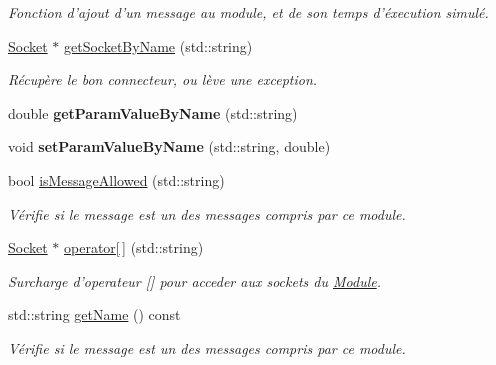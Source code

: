 \begin{DoxyCompactItemize}
\begin{DoxyCompactList}\small\item\em Fonction d'ajout d'un message au module, et de son temps d'éxecution simulé. \end{DoxyCompactList}\item 
\hyperlink{classSocket}{Socket} $\ast$ \hyperlink{classModule_aed844ffed911793d3895c5a2bc4f9d43}{get\-Socket\-By\-Name} (std\-::string)
\begin{DoxyCompactList}\small\item\em Récupère le bon connecteur, ou lève une exception. \end{DoxyCompactList}\item 
\hypertarget{classModule_a93e2ee84587751939c1fd31cb0802e41}{double {\bfseries get\-Param\-Value\-By\-Name} (std\-::string)}\label{classModule_a93e2ee84587751939c1fd31cb0802e41}

\item 
\hypertarget{classModule_ace0e4299e1a6f9b46aa9fd316483895d}{void {\bfseries set\-Param\-Value\-By\-Name} (std\-::string, double)}\label{classModule_ace0e4299e1a6f9b46aa9fd316483895d}

\item 
\hypertarget{classModule_a6e425394cec58009568822cc7a09c8c1}{bool \hyperlink{classModule_a6e425394cec58009568822cc7a09c8c1}{is\-Message\-Allowed} (std\-::string)}\label{classModule_a6e425394cec58009568822cc7a09c8c1}

\begin{DoxyCompactList}\small\item\em Vérifie si le message est un des messages compris par ce module. \end{DoxyCompactList}\item 
\hypertarget{classModule_a2752ad2f437a772d02b474383b5a214f}{\hyperlink{classSocket}{Socket} $\ast$ \hyperlink{classModule_a2752ad2f437a772d02b474383b5a214f}{operator\mbox{[}$\,$\mbox{]}} (std\-::string)}\label{classModule_a2752ad2f437a772d02b474383b5a214f}

\begin{DoxyCompactList}\small\item\em Surcharge d'operateur \mbox{[}\mbox{]} pour acceder aux sockets du \hyperlink{classModule}{Module}. \end{DoxyCompactList}\item 
\hypertarget{classModule_a3c1ecab9c7fa778807e253c26aa54310}{std\-::string \hyperlink{classModule_a3c1ecab9c7fa778807e253c26aa54310}{get\-Name} () const }\label{classModule_a3c1ecab9c7fa778807e253c26aa54310}

\begin{DoxyCompactList}\small\item\em Vérifie si le message est un des messages compris par ce module. \end{DoxyCompactList}\end{DoxyCompactItemize}
